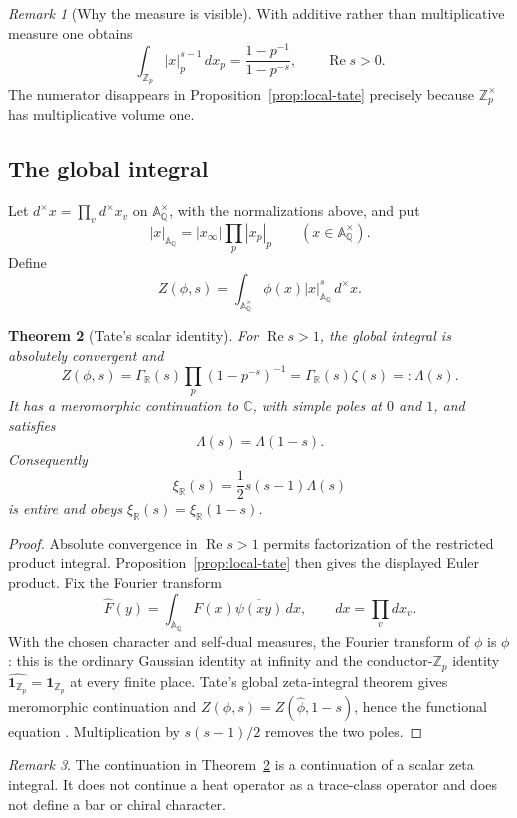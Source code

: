 \documentclass[11pt]{article}
\theoremstyle{plain}
\newtheorem{theorem}{Theorem}[section]
\theoremstyle{definition}
\theoremstyle{remark}
\newtheorem{remark}[theorem]{Remark}
\newcommand{\GammaR}{\Gamma_{\mathbb R}}
\newcommand{\Adele}{\mathbb A_{\mathbb Q}}
\newcommand{\one}{\mathbf 1}
\begin{document}
\begin{remark}[Why the measure is visible]
With additive rather than multiplicative measure one obtains
\[
 \int_{\mathbb Z_p}|x|_p^{s-1}\,dx_p
 =\frac{1-p^{-1}}{1-p^{-s}},
 \qquad \operatorname{Re}s>0.
\]
The numerator disappears in Proposition~\ref{prop:local-tate} precisely
because \(\mathbb Z_p^\times\) has multiplicative volume one.
\end{remark}

\subsection{The global integral}

Let \(d^\times x=\prod_vd^\times x_v\) on \(\Adele^\times\), with the
normalizations above, and put
\[
 |x|_{\Adele}=|x_\infty|\prod_p|x_p|_p
 \qquad (x\in\Adele^\times).
\]
Define
\[
 Z(\phi,s)=\int_{\Adele^\times}\phi(x)|x|_{\Adele}^{s}\,d^\times x.
\]

\begin{theorem}[Tate's scalar identity]
\label{thm:tate}
For \(\operatorname{Re}s>1\), the global integral is absolutely convergent
and
\[
 Z(\phi,s)=\GammaR(s)\prod_p(1-p^{-s})^{-1}
 =\GammaR(s)\zeta(s)=:\Lambda(s).
\]
It has a meromorphic continuation to \(\mathbb C\), with simple poles at
\(0\) and \(1\), and satisfies
\[
 \Lambda(s)=\Lambda(1-s).
\]
Consequently
\[
 \xi_{\mathbb R}(s)=\frac12s(s-1)\Lambda(s)
\]
is entire and obeys \(\xi_{\mathbb R}(s)=\xi_{\mathbb R}(1-s)\).
\end{theorem}

\begin{proof}
Absolute convergence in \(\operatorname{Re}s>1\) permits factorization of
the restricted product integral.  Proposition~\ref{prop:local-tate} then
gives the displayed Euler product.  Fix the Fourier transform
\[
 \widehat F(y)=\int_{\Adele}F(x)\overline{\psi(xy)}\,dx,
 \qquad dx=\prod_vdx_v.
\]
With the chosen character and self-dual measures, the Fourier transform of
\(\phi\) is \(\phi\): this is the ordinary Gaussian
identity at infinity and the conductor-\(\mathbb Z_p\) identity
\(\widehat{\one_{\mathbb Z_p}}=\one_{\mathbb Z_p}\) at every finite place.
Tate's global zeta-integral theorem gives meromorphic continuation and
\(Z(\phi,s)=Z(\widehat\phi,1-s)\), hence the functional equation
\cite[Chapter~II, \S\S2.2--2.6 and Chapter~IV, \S4.4]{Tate1950}.
Multiplication by \(s(s-1)/2\) removes the two poles.
\end{proof}

\begin{remark}
The continuation in Theorem~\ref{thm:tate} is a continuation of a scalar
zeta integral.  It does not continue a heat operator as a trace-class
operator and does not define a bar or chiral character.
\end{remark}
\end{document}

